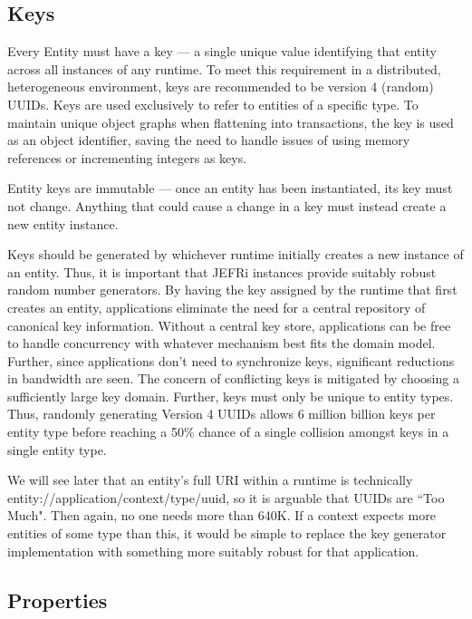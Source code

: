 \documentclass{article}
\renewcommand{\|}{\textbar}
\begin{document}
\subsection{Keys}

Every Entity must have a key --- a single unique value identifying that entity
across all instances of any runtime. To meet this requirement in a distributed,
heterogeneous environment, keys are recommended to be version 4 (random) UUIDs.
Keys are used exclusively to refer to entities of a specific type. To maintain
unique object graphs when flattening into transactions, the key is used as an
object identifier, saving the need to handle issues of using memory references
or incrementing integers as keys.

Entity keys are immutable --- once an entity has been instantiated, its key must
not change. Anything that could cause a change in a key must instead create a
new entity instance.

Keys should be generated by whichever runtime initially creates a new instance
of an entity. Thus, it is important that JEFRi instances provide suitably robust
random number generators. By having the key assigned by the runtime that first
creates an entity, applications eliminate the need for a central repository of
canonical key information. Without a central key store, applications can be free
to handle concurrency with whatever mechanism best fits the domain model.
Further, since applications don't need to synchronize keys, significant
reductions in bandwidth are seen. The concern of conflicting keys is mitigated
by choosing a sufficiently large key domain. Further, keys must only be unique
to entity types. Thus, randomly generating Version 4 UUIDs allows 6 million
billion keys per entity type before reaching a 50\% chance of a single collision
amongst keys in a single entity type.

We will see later that an entity's full URI within a runtime is technically
{\ilcode entity://\-application/\-context/\-type/\-uuid}, so it is arguable that
UUIDs are ``Too Much". Then again, no one needs more than 640K. If a context
expects more entities of some type than this, it would be simple to replace the
key generator implementation with something more suitably robust for that
application.

\subsection{Properties}
\end{document}
